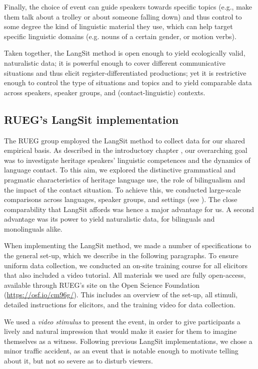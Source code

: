 \documentclass[output=paper,colorlinks,citecolor=brown]{langscibook}
\begin{document}
Finally, the choice of event can guide speakers towards specific topics (e.g., make them talk about a trolley or about someone falling down) and thus control to some degree the kind of linguistic material they use, which can help target specific linguistic domains (e.g. nouns of a certain gender, or motion verbs).

Taken together, the LangSit method is open enough to yield ecologically valid, naturalistic data; it is powerful enough to cover different communicative situations and thus elicit register-differentiated productions; yet it is restrictive enough to control the type of situations and topics and to yield comparable data across speakers, speaker groups, and (contact-linguistic) contexts.

\subsection{RUEG’s LangSit implementation} \label{ch1:sec:2.2}
The RUEG group employed the LangSit method to collect data for our shared empirical basis. As described in the introductory chapter , our overarching goal was to investigate heritage speakers’ linguistic competences and the dynamics of language contact. To this aim, we explored the distinctive grammatical and pragmatic characteristics of heritage language use, the role of bilingualism and the impact of the contact situation. To achieve this, we conducted large-scale comparisons across languages, speaker groups, and settings (see ). The close comparability that LangSit affords was hence a major advantage for us. A second advantage was its power to yield naturalistic data, for bilinguals and monolinguals alike.

When implementing the LangSit method, we made a number of specifications to the general set-up, which we describe in the following paragraphs. To ensure uniform data collection, we conducted an on-site training course for all elicitors that also included a video tutorial. All materials we used are fully open-access, available through RUEG’s site on the Open Science Foundation (\url{https://osf.io/cm96g/}). This includes an overview of the set-up, all stimuli, detailed instructions for elicitors, and the training video for data collection.

We used a \textit{video stimulus} to present the event, in order to give participants a lively and natural impression that would make it easier for them to imagine themselves as a witness. Following previous LangSit implementations, we chose a minor traffic accident, as an event that is notable enough to motivate telling about it, but not so severe as to disturb viewers.
\end{document}
